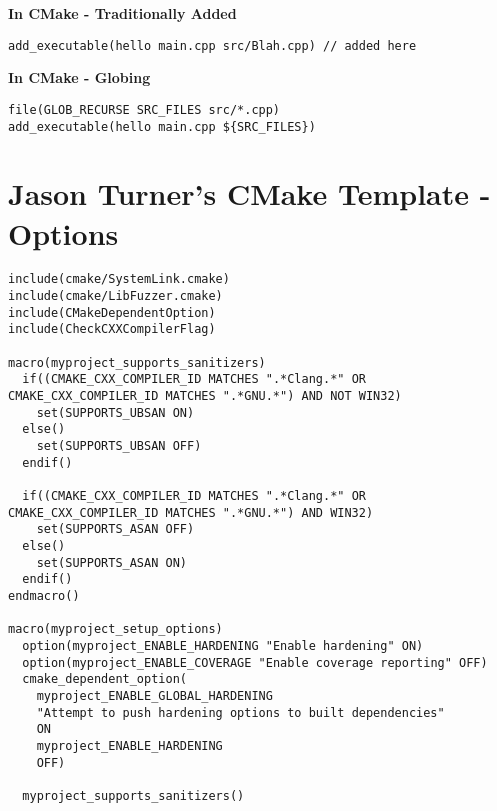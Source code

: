 \textbf{In CMake - Traditionally Added}
\begin{verbatim}
add_executable(hello main.cpp src/Blah.cpp) // added here
\end{verbatim}

\textbf{In CMake - Globing}
\begin{verbatim}
file(GLOB_RECURSE SRC_FILES src/*.cpp)
add_executable(hello main.cpp ${SRC_FILES})
\end{verbatim}

\section{Jason Turner's CMake Template - Options}

\begin{verbatim}
include(cmake/SystemLink.cmake)
include(cmake/LibFuzzer.cmake)
include(CMakeDependentOption)
include(CheckCXXCompilerFlag)

macro(myproject_supports_sanitizers)
  if((CMAKE_CXX_COMPILER_ID MATCHES ".*Clang.*" OR CMAKE_CXX_COMPILER_ID MATCHES ".*GNU.*") AND NOT WIN32)
    set(SUPPORTS_UBSAN ON)
  else()
    set(SUPPORTS_UBSAN OFF)
  endif()

  if((CMAKE_CXX_COMPILER_ID MATCHES ".*Clang.*" OR CMAKE_CXX_COMPILER_ID MATCHES ".*GNU.*") AND WIN32)
    set(SUPPORTS_ASAN OFF)
  else()
    set(SUPPORTS_ASAN ON)
  endif()
endmacro()

macro(myproject_setup_options)
  option(myproject_ENABLE_HARDENING "Enable hardening" ON)
  option(myproject_ENABLE_COVERAGE "Enable coverage reporting" OFF)
  cmake_dependent_option(
    myproject_ENABLE_GLOBAL_HARDENING
    "Attempt to push hardening options to built dependencies"
    ON
    myproject_ENABLE_HARDENING
    OFF)

  myproject_supports_sanitizers()


\end{verbatim}
